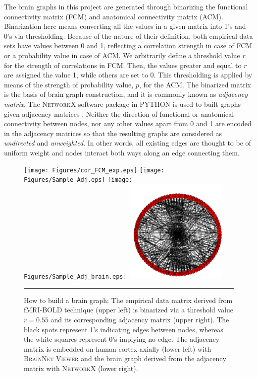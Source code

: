 The brain graphs in this project are generated through binarizing the functional connectivity matrix (FCM) and anatomical connectivity matrix (ACM). Binarization here means converting all the values in a given matrix into 1's and 0's via thresholding. Because of the nature of their definition, both empirical data sets have values between 0 and 1, reflecting a correlation strength in case of FCM or a probability value in case of ACM. We arbitrarily define a threshold value $r$ for the strength of correlations in FCM. Then, the values greater and equal to $r$ are assigned the value 1, while others are set to 0. This thresholding is applied by means of the strength of probability value, $p$, for the ACM. The binarized matrix is the basis of brain graph construction, and it is commonly known as \textit{adjacency matrix}. The \textsc{NetworkX} software package in \textsc{PYTHON} is used to built graphs given adjacency matrices \citep{XYZNETW}. Neither the direction of functional or anatomical connectivity between nodes, nor any other values apart from 0 and 1  are encoded in the adjacency matrices  so that the resulting graphs are considered as \textit{undirected} and \textit{unweighted}. In other words, all existing edges are thought to be of uniform weight and nodes interact both ways along an edge connecting them. 

\begin{figure}[htbp]
  \centering
	 \texttt{[image: Figures/cor\_FCM\_exp.eps]} 
	 \texttt{[image: Figures/Sample\_Adj.eps]} 
	\texttt{[image: Figures/Sample\_Adj\_brain.eps]}  
   \includegraphics[width=0.45\textwidth]{Figures/brain_graph.png}      

    \rule{35em}{0.5pt}
  \caption[Binarizing via Thresholding]{How to build a brain graph: The empirical data matrix derived from fMRI-BOLD technique (upper left) is binarized via a threshold value $r=0.55$ and its corresponding adjacency matrix (upper right). The black spots represent 1's indicating edges between nodes, whereas the white squares represent 0's implying no edge. The adjacency matrix is embedded on human cortex axially (lower left) with \textsc{BrainNet Viewer} \citep{XYZ13} and the brain graph derived from the adjacency matrix with \textsc{NetworkX} \citep{XYZNETW}(lower right).}
  \label{fig:Binarizing via Thresholding}
\end{figure}

